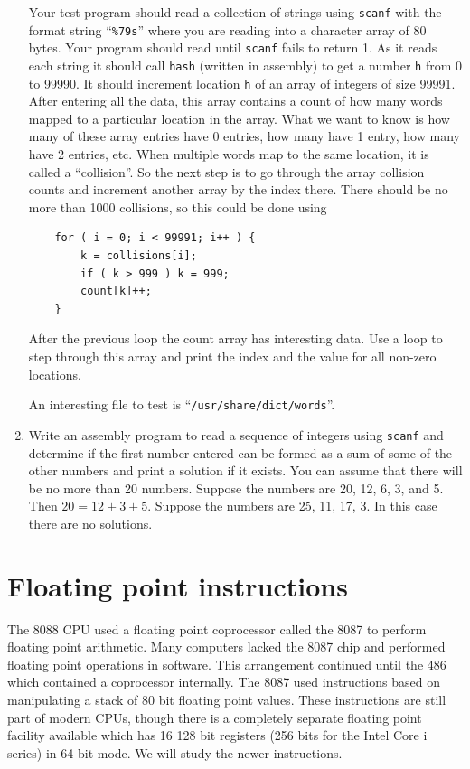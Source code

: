 \documentclass[11pt,b5paper]{book}
\begin{document}
\begin{enumerate}
    Your test program should read a collection of strings using {\tt scanf} with the format string ``{\tt \%79s}''
    where you are reading into a character array of 80 bytes.
    Your program should read until {\tt scanf} fails to return 1.
    As it reads each string it should call {\tt hash} (written in assembly) to get a number {\tt h} from 0 to 99990.
    It should increment location {\tt h} of an array of integers of size 99991.
    After entering all the data, this array contains a count of how many words mapped to a particular location in
    the array.
    What we want to know is how many of these array entries have 0 entries, how many have 1 entry, how many
    have 2 entries, etc.
    When multiple words map to the same location, it is called a ``collision''.
    So the next step is to go through the array collision counts and increment another array by the index there.
    There should be no more than 1000 collisions, so this could be done using 
    \begin{verbatim}
    for ( i = 0; i < 99991; i++ ) {
        k = collisions[i];
        if ( k > 999 ) k = 999;
        count[k]++;
    }
    \end{verbatim}

    After the previous loop the count array has interesting data.
    Use a loop to step through this array and print the index and the value for all non-zero locations.
   
    An interesting file to test is ``{\tt /usr/share/dict/words}''.

    \item Write an assembly program to read a sequence of integers using {\tt scanf} and determine
    if the first number entered can be formed as a sum of some of the other numbers
    and print a solution if it exists.
    You can assume that there will be no more than 20 numbers.
    Suppose the numbers are 20, 12, 6, 3, and 5.  Then $20 = 12+3+5$.
    Suppose the numbers are 25, 11, 17, 3.  In this case there are no solutions.
    
\end{enumerate}

\chapter{Floating point instructions}

The 8088 CPU used a floating point coprocessor called the 8087 to perform floating point arithmetic.  
Many computers lacked the 8087 chip and performed floating point operations in software.
This arrangement continued until the 486 which contained a coprocessor internally. 
The 8087 used instructions based on manipulating a stack of 80 bit floating point values.
These instructions are still part of modern CPUs, though there is a completely separate
floating point facility available which has 16 128 bit registers (256 bits for the Intel Core i series)
in 64 bit mode.
We will study the newer instructions.
\end{document}
